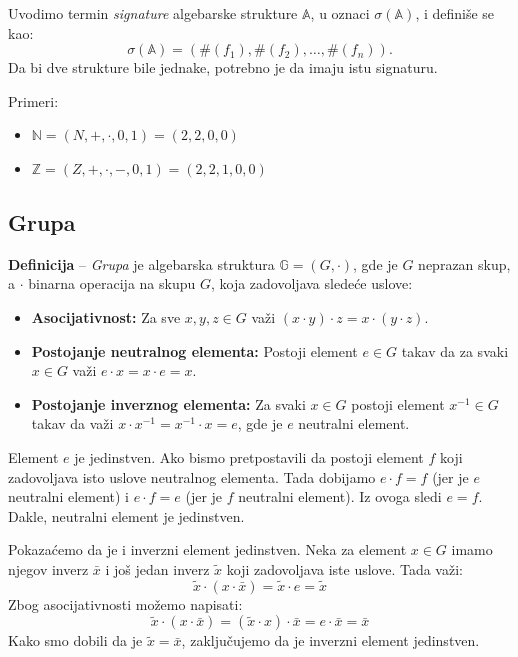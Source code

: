 \documentclass[a4paper,12pt]{article}
\begin{document}
Uvodimo termin \emph{signature} algebarske strukture $\mathbb{A}$, u oznaci \( \sigma (\mathbb{A}) \), i definiše se kao:
\[\sigma (\mathbb{A}) = (\#(f_1), \#(f_2), \dots, \#(f_n)).\]
Da bi dve strukture bile jednake, potrebno je da imaju istu signaturu.

Primeri:
\begin{itemize}
  \item \(\mathbb{N} = (N, +, \cdot, 0, 1) = (2, 2, 0, 0)\) 
  \item \(\mathbb{Z} = (Z, +, \cdot, -, 0, 1) = (2, 2, 1, 0, 0)\)
\end{itemize}

\subsection{Grupa}

\textbf{Definicija} -- \emph{Grupa} je algebarska struktura \(\mathbb{G} = (G, \cdot)\), gde je \(G\) neprazan skup, a \(\cdot\) binarna operacija na skupu \(G\), koja zadovoljava sledeće uslove:
\begin{itemize}
  \item \textbf{Asocijativnost:} Za sve \(x, y, z \in G\) važi \((x \cdot y) \cdot z = x \cdot (y \cdot z)\).
  \item \textbf{Postojanje neutralnog elementa:} Postoji element \(e \in G\) takav da za svaki \(x \in G\) važi \(e \cdot x = x \cdot e = x\).
  \item \textbf{Postojanje inverznog elementa:} Za svaki \(x \in G\) postoji element \(x^{-1} \in G\) takav da važi \(x \cdot x^{-1} = x^{-1} \cdot x = e\), gde je \(e\) neutralni element.
\end{itemize}

Element \(e\) je jedinstven. Ako bismo pretpostavili da postoji element \( f \) koji 
zadovoljava isto uslove neutralnog elementa. Tada dobijamo \( e \cdot f = f \) 
(jer je \( e \) neutralni element) i \( e \cdot f = e \) (jer je \( f \) neutralni element). 
Iz ovoga sledi \( e = f \). Dakle, neutralni element je jedinstven.

Pokazaćemo da je i inverzni element jedinstven. Neka za element \( x \in G \) imamo njegov inverz \( \bar{x} \) i još jedan inverz \( \tilde{x} \) koji zadovoljava iste uslove.
Tada važi:
\[
  \tilde{x} \cdot (x \cdot \bar{x}) = \tilde{x} \cdot e = \tilde{x}
\]
Zbog asocijativnosti možemo napisati:
\[
  \tilde{x} \cdot (x \cdot \bar{x}) = (\tilde{x} \cdot x) \cdot \bar{x} = e \cdot \bar{x} = \bar{x}
\]
Kako smo dobili da je \( \tilde{x} = \bar{x} \), zaključujemo da je inverzni element jedinstven.
\end{document}
